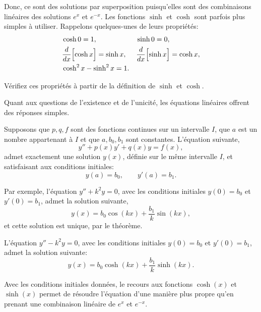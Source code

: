 Donc, ce sont des solutions par superposition puisqu'elles sont des combinaisons linéaires des solutions $e^x$ et $e^{-x}$.   Les fonctions $\sinh$ et $\cosh$ sont parfois plus simples à utiliser.  Rappelons quelques-unes de leurs propriétés:
\begin{align*}
	& \cosh 0  = 1 , &   & \sinh 0 = 0 , \\
	& \frac{d}{dx} \Bigl[ \cosh x \Bigr] = \sinh x , &  & \frac{d}{dx} \Bigl[ \sinh x \Bigr] = \cosh x , \\
	& \cosh^2 x - \sinh^2 x = 1 .
\end{align*}


\begin{exercise}
Vérifiez ces propriétés à partir de la définition de $\sinh$
et $\cosh$.
\end{exercise}

Quant aux questions de l'existence et de l'unicité, les équations linéaires offrent des réponses simples.

\begin{theorem}
	Supposons que $p, q, f$ sont des fonctions continues sur un intervalle
	$I$, que $a$ est un nombre appartenant à $I$ et que $a, b_0, b_1$ sont constantes.
	L'équation suivante,  
	\begin{equation*}
		y'' + p(x) y' + q(x) y = f(x),
	\end{equation*}
	admet exactement une solution $y(x)$, définie sur le même intervalle $I$, et satisfaisant aux conditions initiales: 
	\begin{equation*}
		y(a) = b_0 , \qquad y'(a) = b_1 .
	\end{equation*}
\end{theorem}

Par exemple, l'équation $y'' + k^2 y = 0$, avec les conditions initiales $y(0) = b_0$ et $y'(0) = b_1$,
admet la solution suivante, 
\begin{equation*}
	y(x) = b_0 \cos (kx) + \frac{b_1}{k} \sin (kx),  
\end{equation*}
et cette solution est unique, par le théorème.

L'équation $y'' - k^2 y = 0$, avec les conditions initiales $y(0) = b_0$ et $y'(0) = b_1$,
admet la solution suivante:
\begin{equation*}
	y(x) = b_0 \cosh (kx) + \frac{b_1}{k} \sinh (kx) .
\end{equation*}

Avec les conditions initiales données, le recours aux fonctions $\cosh(x)$ et $\sinh(x)$  permet de résoudre l'équation d'une manière plus propre qu'en prenant une combinaison linéaire de $e^x$ et $e^{-x}$.

